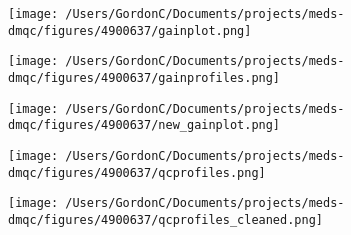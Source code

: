 \begin{figure}[H]
	\centering
	\texttt{[image: /Users/GordonC/Documents/projects/meds-dmqc/figures/4900637/gainplot.png]}
	\caption{}
\end{figure}


\begin{figure}[H]
	\centering
	\texttt{[image: /Users/GordonC/Documents/projects/meds-dmqc/figures/4900637/gainprofiles.png]}
	\caption{}
\end{figure}


\begin{figure}[H]
	\centering
	\texttt{[image: /Users/GordonC/Documents/projects/meds-dmqc/figures/4900637/new\_gainplot.png]}
	\caption{}
\end{figure}


\begin{figure}[H]
	\centering
	\texttt{[image: /Users/GordonC/Documents/projects/meds-dmqc/figures/4900637/qcprofiles.png]}
	\caption{}
\end{figure}


\begin{figure}[H]
	\centering
	\texttt{[image: /Users/GordonC/Documents/projects/meds-dmqc/figures/4900637/qcprofiles\_cleaned.png]}
	\caption{}
\end{figure}


